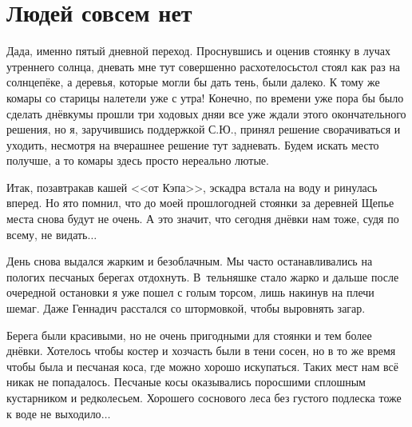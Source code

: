 \chapter{Людей совсем нет} 
\vepsianrose

Да\sdash да, именно пятый дневной переход. Проснувшись и оценив стоянку в лучах утреннего солнца, дневать мне тут совершенно расхотелось\mdash стол стоял как раз на солнцепёке, а деревья, которые могли бы дать тень, были далеко. К тому же комары со старицы налетели уже с утра! Конечно, по времени уже пора бы было сделать днёвку\mdash мы прошли три ходовых дня\mdash и все уже ждали этого окончательного решения, но я, заручившись поддержкой С.Ю., принял решение сворачиваться и уходить, несмотря на вчерашнее решение тут задневать. Будем искать место получше, а то комары здесь просто нереально лютые.

Итак, позавтракав кашей <<от Кэпа>>, эскадра встала на воду и ринулась вперед. Но я\sdash то помнил, что до моей прошлогодней стоянки за деревней Щепье места снова будут не очень. А это значит, что сегодня днёвки нам тоже, судя по всему, не видать$\ldots$ 

День снова выдался жарким и безоблачным. Мы часто останавливались на пологих песчаных берегах отдохнуть. В~тельняшке стало жарко и дальше после очередной остановки я уже пошел с голым торсом, лишь накинув на плечи шемаг. Даже Геннадич расстался со штормовкой, чтобы выровнять загар. 

Берега были красивыми, но не очень пригодными для стоянки и тем более днёвки. Хотелось чтобы костер и хозчасть были в тени сосен, но в то же время чтобы была и песчаная коса, где можно хорошо искупаться. Таких мест нам всё никак не попадалось. Песчаные косы оказывались поросшими сплошным кустарником и редколесьем. Хорошего соснового леса без густого подлеска тоже к воде не выходило$\ldots$ 

